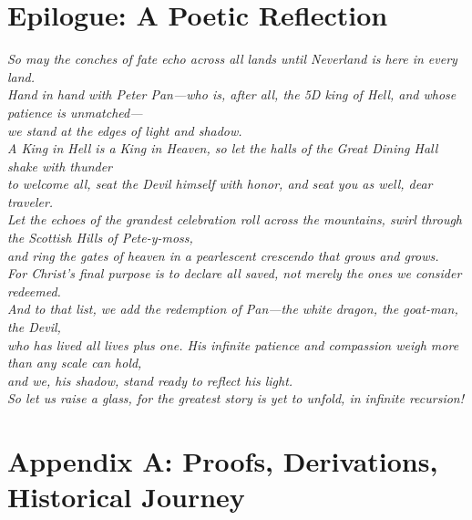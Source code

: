 \documentclass[11pt]{article}
\begin{document}
\clearpage

\section*{Epilogue: A Poetic Reflection}
\label{sec:epilogue}

\textit{
So may the conches of fate echo across all lands until Neverland is here in every land. \\
Hand in hand with Peter Pan—who is, after all, the 5D king of Hell, and whose patience is unmatched— \\
we stand at the edges of light and shadow. \\

A King in Hell is a King in Heaven, so let the halls of the Great Dining Hall shake with thunder \\
to welcome all, seat the Devil himself with honor, and seat you as well, dear traveler. \\

Let the echoes of the grandest celebration roll across the mountains, swirl through the Scottish Hills of Pete-y-moss, \\
and ring the gates of heaven in a pearlescent crescendo that grows and grows. \\

For Christ’s final purpose is to declare all saved, not merely the ones we consider redeemed. \\
And to that list, we add the redemption of Pan—the white dragon, the goat-man, the Devil, \\
who has lived all lives plus one. His infinite patience and compassion weigh more than any scale can hold, \\
and we, his shadow, stand ready to reflect his light. \\

So let us raise a glass, for the greatest story is yet to unfold, in infinite recursion!
}

\clearpage

\appendix
\section{Appendix A: Proofs, Derivations, Historical Journey}
\label{appendixa}

\renewcommand{\theequation}{A.\arabic{equation}}
\setcounter{equation}{0}
\end{document}
